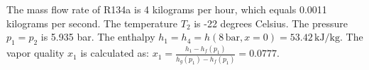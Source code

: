 The mass flow rate of R134a is 4 kilograms per hour, which equals 0.0011 kilograms per second.  
The temperature \( T_2 \) is -22 degrees Celsius.  
The pressure \( p_1 = p_2 \) is 5.935 bar.  
The enthalpy \( h_1 = h_4 = h(8 \, \text{bar}, x = 0) = 53.42 \, \text{kJ/kg} \).  
The vapor quality \( x_1 \) is calculated as:  
\( x_1 = \frac{h_1 - h_f(p_1)}{h_g(p_1) - h_f(p_1)} = 0.0777 \).
